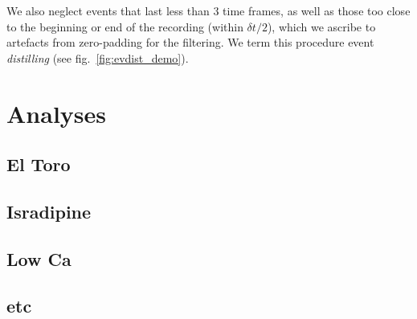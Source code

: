 \documentclass[a4paper,11pt,oneside,]{article}
\begin{document}
We also neglect events that last less than $3$ time frames, as well as those too close to the beginning or end of the recording (within $\delta t/2$), which we ascribe to artefacts from zero-padding for the filtering. 
We term this procedure event {\it distilling} (see fig.~\ref{fig:evdist_demo}).





\section{Analyses}
\subsection{El Toro}
\subsection{Isradipine}
\subsection{Low Ca}
\subsection{etc}

\newpage


\end{document}
